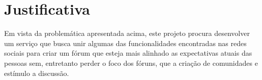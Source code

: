 \documentclass[diss]{template/setrem}
\begin{document}



\section{Justificativa}
Em vista da problemática apresentada acima, este projeto procura desenvolver um serviço que busca unir algumas das funcionalidades encontradas nas redes sociais para criar um fórum que esteja mais alinhado as expectativas atuais das pessoas sem, entretanto perder o foco dos fóruns, que a criação de comunidades e estímulo a discussão.

\end{document}
